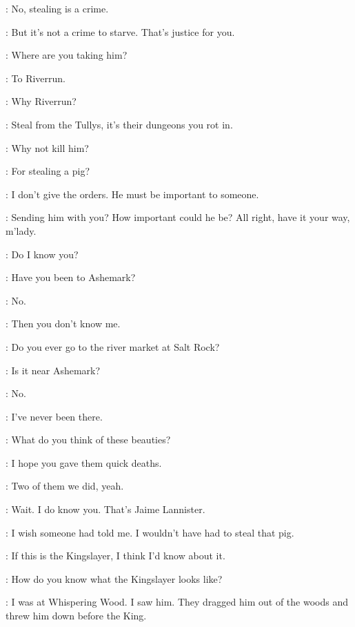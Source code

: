 \BRIENNE: No, stealing is a crime. 

\JAIME: But it's not a crime to starve. That's justice for you. 

\STARKSOLDIERa: Where are you taking him? 

\BRIENNE: To Riverrun. 

\STARKSOLDIERb: Why Riverrun? 

\BRIENNE: Steal from the Tullys, it's their dungeons you rot in. 

\STARKSOLDIERb: Why not kill him? 

\JAIME: For stealing a pig? 

\BRIENNE: I don't give the orders. He must be important to someone. 

\STARKSOLDIERa: Sending him with you? How important could he be? All right, have it your way, m'lady. 

\STARKSOLDIERb:  Do I know you? 

\JAIME: Have you been to Ashemark? 

\STARKSOLDIERb: No. 

\JAIME: Then you don't know me. 

\STARKSOLDIERb: Do you ever go to the river market at Salt Rock? 

\JAIME: Is it near Ashemark?

\STARKSOLDIERb: No. 

\JAIME: I've never been there. 

\STARKSOLDIERa: What do you think of these beauties? 


\BRIENNE: I hope you gave them quick deaths. 

\STARKSOLDIERa: Two of them we did, yeah. 


\STARKSOLDIERb: Wait.  I do know you.  That's Jaime Lannister. 

\JAIME: I wish someone had told me. I wouldn't have had to steal that pig. 

\BRIENNE: If this is the Kingslayer, I think I'd know about it. 

\STARKSOLDIERa: How do you know what the Kingslayer looks like? 

\STARKSOLDIERb: I was at Whispering Wood. I saw him. They dragged him out of the woods and threw him down before the King. 

